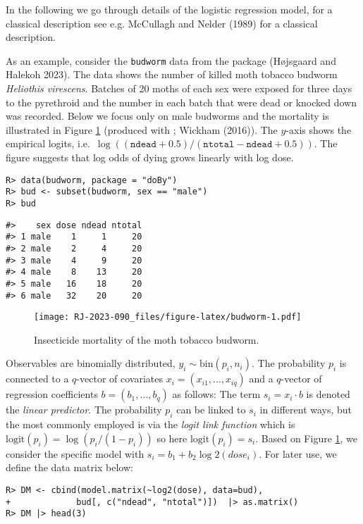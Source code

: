 In the following we go through details of the logistic regression model,
for a classical description see e.g. McCullagh and Nelder (1989) for a classical description.

As an example, consider the \texttt{budworm} data from the  package (Højsgaard and Halekoh 2023).
The data shows the number of killed moth tobacco budworm
\emph{Heliothis virescens}. Batches of 20 moths of each sex were
exposed for three days to the pyrethroid and the number in each batch
that were dead or knocked down was recorded.
Below we focus only on male budworms and the mortality is illustrated
in Figure \ref{fig:budworm} (produced with ; Wickham (2016)). The \(y\)-axis shows the empirical
logits, i.e.~\(\log((\texttt{ndead} + 0.5)/(\texttt{ntotal}-\texttt{ndead} + 0.5))\). The figure suggests that log odds of dying grows linearly with log dose.

\begin{verbatim}
R> data(budworm, package = "doBy")
R> bud <- subset(budworm, sex == "male")
R> bud
\end{verbatim}

\begin{verbatim}
#>    sex dose ndead ntotal
#> 1 male    1     1     20
#> 2 male    2     4     20
#> 3 male    4     9     20
#> 4 male    8    13     20
#> 5 male   16    18     20
#> 6 male   32    20     20
\end{verbatim}

\begin{figure}
\centering
\texttt{[image: RJ-2023-090\_files/figure-latex/budworm-1.pdf]}
\caption{\label{fig:budworm}Insecticide mortality of the moth tobacco budworm.}
\end{figure}

Observables are binomially distributed, \(y_i \sim \text{bin}(p_i, n_i)\). The probability \(p_i\) is connected to a \(q\)-vector of
covariates \(x_i=(x_{i1}, \dots, x_{iq})\) and a \(q\)-vector of
regression coefficients \(b=(b_1, \dots, b_q)\) as follows: The term
\(s_i = x_i \cdot b\) is denoted the \emph{linear predictor}. The
probability \(p_i\) can be linked to \(s_i\) in different ways, but the
most commonly employed is via the \emph{logit link function} which is
\(\text{logit}(p_i) = \log(p_i/(1-p_i))\) so here \(\text{logit}(p_i) = s_i\). Based on Figure \ref{fig:budworm}, we consider the specific
model with \(s_i = b_1 + b_2 \log2(dose_i)\). For later use, we define the data matrix below:

\begin{verbatim}
R> DM <- cbind(model.matrix(~log2(dose), data=bud),
+             bud[, c("ndead", "ntotal")])  |> as.matrix()
R> DM |> head(3)
\end{verbatim}

